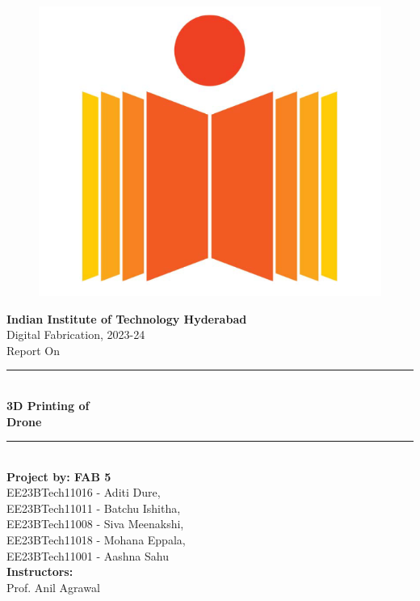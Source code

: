 \documentclass{article}
\begin{document}
\begin{figure}[H]
\centering
\includegraphics[scale = 0.2 ]{./figs/logo.png}
\end{figure}

\begin{center}
	\textbf{\LARGE Indian Institute of Technology Hyderabad} \\
	\vspace{1cm}
	\Large Digital Fabrication, 2023-24\\
	\vspace{0.3cm}
	\large Report  On\\

	\rule{\linewidth}{0.5pt} \\
	\vspace{0.2cm}
	\textbf{\LARGE 3D Printing of  \\ \vspace{0.3cm} Drone} \\
	\vspace{0.1cm}
	\rule{\linewidth}{0.5pt} \\

	\vspace{1.5cm}
        \textbf{Project by: FAB 5}\\
	\quad EE23BTech11016 - Aditi Dure, \\
	\quad EE23BTech11011 - Batchu Ishitha, \\
	\quad EE23BTech11008 - Siva Meenakshi, \\
	\quad EE23BTech11018 - Mohana Eppala, \\
	\quad EE23BTech11001 - Aashna Sahu \\
	
	\textbf{Instructors: }\\
	\quad Prof. Anil Agrawal \\
	
	

	\vspace{1cm}
	\date{}
\end{center}
\end{document}
